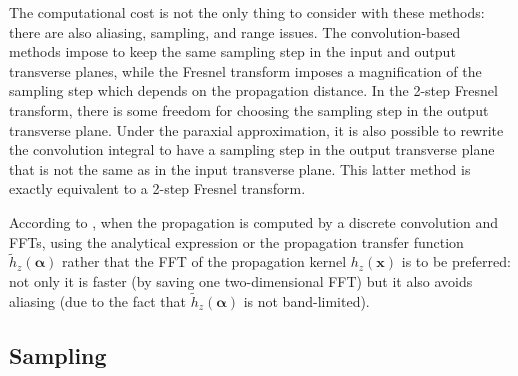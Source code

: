 \documentclass[a4paper]{article}
\newcommand*{\V}[1]{\boldsymbol{#1}}
\newcommand*{\FT}[1]{\widetilde{#1}}
\begin{document}
The computational cost is not the only thing to consider with these methods: there are
also aliasing, sampling, and range issues. The convolution-based methods impose to keep
the same sampling step in the input and output transverse planes, while the Fresnel
transform imposes a magnification of the sampling step which depends on the propagation
distance. In the 2-step Fresnel transform, there is some freedom for choosing the sampling
step in the output transverse plane. Under the paraxial approximation, it is also possible
to rewrite the convolution integral to have a sampling step in the output transverse plane
that is not the same as in the input transverse plane. This latter method is exactly
equivalent to a 2-step Fresnel transform.


According to \citet{Kopp+1998-Near_field_Fresnel_diffraction}, when the propagation is
computed by a discrete convolution and FFTs, using the analytical expression or the
propagation transfer function $\FT{h}_{z}(\V{α})$ rather that the FFT of the propagation
kernel $h_{z}(\V{x})$ is to be preferred: not only it is faster (by saving one
two-dimensional FFT) but it also avoids aliasing (due to the fact that
$\FT{h}_{z}(\V{α})$ is not band-limited).
\subsection{Sampling}
\end{document}

